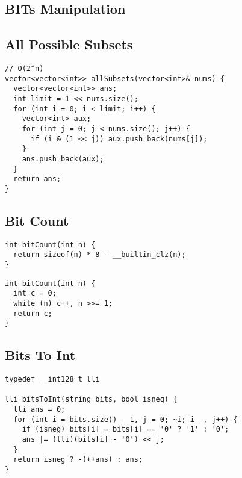 \documentclass[twoside]{article}
\newcommand{\fileTitleStyle}{\large\underline}
\begin{document}
\begin{multicols*}{2}
\sectionfont{\centering\bfseries\Huge}
\vspace{1em}
\section*{BITs Manipulation}
\vspace{3em}
\subsectionfont{\centering\bfseries\LARGE}
\subsectionfont{\fileTitleStyle}
\subsection*{All Possible Subsets}
\begin{verbatim}
// O(2^n)
vector<vector<int>> allSubsets(vector<int>& nums) {
  vector<vector<int>> ans;
  int limit = 1 << nums.size();
  for (int i = 0; i < limit; i++) {
    vector<int> aux;
    for (int j = 0; j < nums.size(); j++) {
      if (i & (1 << j)) aux.push_back(nums[j]);
    }
    ans.push_back(aux);
  }
  return ans;
}
\end{verbatim}

\subsectionfont{\centering\bfseries\LARGE}
\subsectionfont{\fileTitleStyle}
\subsection*{Bit Count}
\begin{verbatim}
int bitCount(int n) {
  return sizeof(n) * 8 - __builtin_clz(n);
}
\end{verbatim}
\vspace{-12pt}
\begin{verbatim}
int bitCount(int n) {
  int c = 0;
  while (n) c++, n >>= 1;
  return c;
}
\end{verbatim}

\subsectionfont{\centering\bfseries\LARGE}
\subsectionfont{\fileTitleStyle}
\subsection*{Bits To Int}
\begin{verbatim}
typedef __int128_t lli

lli bitsToInt(string bits, bool isneg) {
  lli ans = 0;
  for (int i = bits.size() - 1, j = 0; ~i; i--, j++) {
    if (isneg) bits[i] = bits[i] == '0' ? '1' : '0';
    ans |= (lli)(bits[i] - '0') << j;
  }
  return isneg ? -(++ans) : ans;
}
\end{verbatim}


\end{multicols*}
\end{document}

